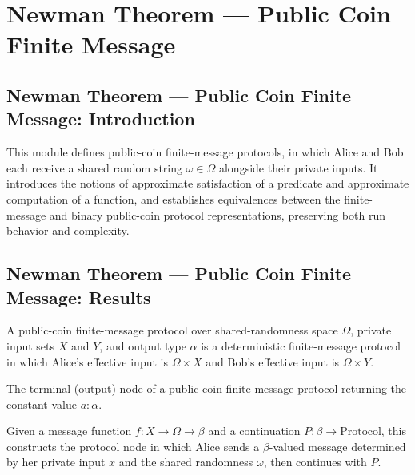 \section{Newman Theorem --- Public Coin Finite Message}
\subsection*{Newman Theorem --- Public Coin Finite Message: Introduction}

This module defines public-coin finite-message protocols, in which Alice and Bob each
receive a shared random string $\omega \in \Omega$ alongside their private inputs.
It introduces the notions of approximate satisfaction of a predicate and approximate
computation of a function, and establishes equivalences between the finite-message and
binary public-coin protocol representations, preserving both run behavior and complexity.

\subsection*{Newman Theorem --- Public Coin Finite Message: Results}

\begin{definition}
\label{CommunicationComplexity.PublicCoin.FiniteMessage.Protocol}
\leanok
{}
A public-coin finite-message protocol over shared-randomness space $\Omega$, private input
sets $X$ and $Y$, and output type $\alpha$ is a deterministic finite-message protocol in
which Alice's effective input is $\Omega \times X$ and Bob's effective input is
$\Omega \times Y$.
\end{definition}

\begin{definition}
\label{CommunicationComplexity.PublicCoin.FiniteMessage.Protocol.output}
\leanok
{}
The terminal (output) node of a public-coin finite-message protocol returning the
constant value $a : \alpha$.
\end{definition}

\begin{definition}
\label{CommunicationComplexity.PublicCoin.FiniteMessage.Protocol.alice}
\leanok
{}
Given a message function $f : X \to \Omega \to \beta$ and a continuation
$P : \beta \to \mathrm{Protocol}$, this constructs the protocol node in which Alice sends
a $\beta$-valued message determined by her private input $x$ and the shared randomness
$\omega$, then continues with $P$.
\end{definition}

